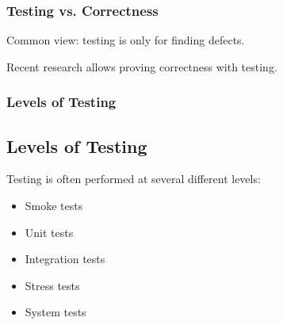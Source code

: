 \begin{frame}
\frametitle{Testing vs. Correctness}
\begin{changemargin}{1cm}

Common view: testing is only for finding defects.

Recent research allows proving correctness with testing.

\end{changemargin}
\end{frame}

\begin{frame}
\frametitle{Levels of Testing}
\begin{changemargin}{1cm}

\subsection*{Levels of Testing}
Testing is often performed at several different levels:
\begin{itemize}
\item Smoke tests 
\item Unit tests 
\item Integration tests 
\item Stress tests 
\item System tests 
\end{itemize}


\end{changemargin}
\end{frame}

